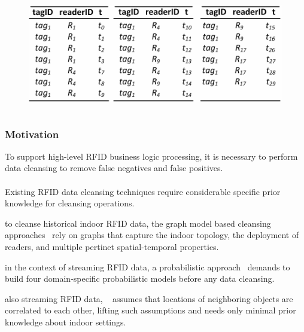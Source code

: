 \begin{frame}
\begin{columns}
  \begin{figure}[tb]
    \includegraphics[width=\columnwidth]{figures/3-5/3-5-2.pdf}
  \end{figure}

\end{columns}

\end{frame}


\begin{frame}
\frametitle{Motivation}

To support high-level RFID business logic processing, it is necessary to perform data cleansing to remove false negatives and false positives.\\~\\

Existing RFID data cleansing techniques require considerable specific prior knowledge for cleansing operations.

\begin{sitemize}
  \item to cleanse historical indoor RFID data, the graph model based cleansing approaches~\cite{baba2013spatiotemporal,baba2013graph,DBLP:conf/edbt/FazzingaFFP14} rely on graphs that capture the indoor topology, the deployment of readers, and multiple pertinet spatial-temporal properties.
  \item in the context of streaming RFID data, a probabilistic approach~\cite{tran2009probabilistic} demands to build four domain-specific probabilistic models before any data cleansing.
  \item also streaming RFID data, ~\cite{nie2009probabilistic} assumes that locations of neighboring objects are correlated to each other, lifting such assumptions and needs only minimal prior knowledge about indoor settings.
\end{sitemize}

\end{frame}

